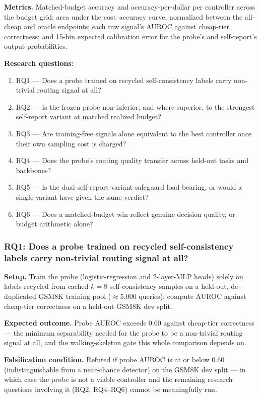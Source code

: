 \documentclass[11pt]{article}
\begin{document}
\textbf{Metrics.} Matched-budget accuracy and accuracy-per-dollar per controller across the budget grid; area under the cost--accuracy curve, normalized between the all-cheap and oracle endpoints; each raw signal's AUROC against cheap-tier correctness; and 15-bin expected calibration error for the probe's and self-report's output probabilities.

\textbf{Research questions:}
\begin{enumerate}[leftmargin=1.6em]
\item RQ1 --- Does a probe trained on recycled self-consistency labels carry non-trivial routing signal at all?
\item RQ2 --- Is the frozen probe non-inferior, and where superior, to the strongest self-report variant at matched realized budget?
\item RQ3 --- Are training-free signals alone equivalent to the best controller once their own sampling cost is charged?
\item RQ4 --- Does the probe's routing quality transfer across held-out tasks and backbones?
\item RQ5 --- Is the dual-self-report-variant safeguard load-bearing, or would a single variant have given the same verdict?
\item RQ6 --- Does a matched-budget win reflect genuine decision quality, or budget arithmetic alone?
\end{enumerate}

\subsubsection{RQ1: Does a probe trained on recycled self-consistency labels carry non-trivial routing signal at all?}
\textbf{Setup.} Train the probe (logistic-regression and 2-layer-MLP heads) solely on labels recycled from cached $k=8$ self-consistency samples on a held-out, de-duplicated GSM8K training pool ($\approx$5,000 queries); compute AUROC against cheap-tier correctness on a held-out GSM8K dev split.

\textbf{Expected outcome.} Probe AUROC exceeds 0.60 against cheap-tier correctness --- the minimum separability needed for the probe to be a non-trivial routing signal at all, and the walking-skeleton gate this whole comparison depends on.

\textbf{Falsification condition.} Refuted if probe AUROC is at or below 0.60 (indistinguishable from a near-chance detector) on the GSM8K dev split --- in which case the probe is not a viable controller and the remaining research questions involving it (RQ2, RQ4--RQ6) cannot be meaningfully run.
\end{document}
